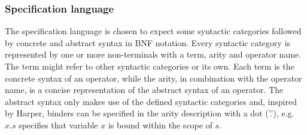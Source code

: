 \subsubsection{Specification language}

The specification language is chosen to expect some syntactic categories followed by concrete and abstract syntax in BNF notation.  %
Every syntactic category is represented by one or more non-terminals with a term, arity and operator name. The term might refer to other syntactic categories or its own. Each term is the concrete syntax of an operator, while the arity, in combination with the operator name, is a concise representation of the abstract syntax of an operator.
The abstract syntax only makes use of the defined syntactic categories and, inspired by Harper\cite{harper}, binders can be specified in the arity description with a dot ('.'), e.g. $x.s$ specifies that variable $x$ is bound within the scope of $s$.



